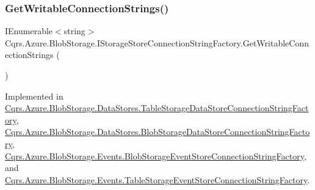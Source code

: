 \subsubsection{\texorpdfstring{Get\+Writable\+Connection\+Strings()}{GetWritableConnectionStrings()}}
{\footnotesize\ttfamily I\+Enumerable$<$string$>$ Cqrs.\+Azure.\+Blob\+Storage.\+I\+Storage\+Store\+Connection\+String\+Factory.\+Get\+Writable\+Connection\+Strings (\begin{DoxyParamCaption}{ }\end{DoxyParamCaption})}



Implemented in \hyperlink{classCqrs_1_1Azure_1_1BlobStorage_1_1DataStores_1_1TableStorageDataStoreConnectionStringFactory_a65b6f404ac2434c6366af73a22e914d1_a65b6f404ac2434c6366af73a22e914d1}{Cqrs.\+Azure.\+Blob\+Storage.\+Data\+Stores.\+Table\+Storage\+Data\+Store\+Connection\+String\+Factory}, \hyperlink{classCqrs_1_1Azure_1_1BlobStorage_1_1DataStores_1_1BlobStorageDataStoreConnectionStringFactory_a71b549351646fd4261b3f52f264759f4_a71b549351646fd4261b3f52f264759f4}{Cqrs.\+Azure.\+Blob\+Storage.\+Data\+Stores.\+Blob\+Storage\+Data\+Store\+Connection\+String\+Factory}, \hyperlink{classCqrs_1_1Azure_1_1BlobStorage_1_1Events_1_1BlobStorageEventStoreConnectionStringFactory_a002b45d6a893b1b3024b0e7c97f1c9ac_a002b45d6a893b1b3024b0e7c97f1c9ac}{Cqrs.\+Azure.\+Blob\+Storage.\+Events.\+Blob\+Storage\+Event\+Store\+Connection\+String\+Factory}, and \hyperlink{classCqrs_1_1Azure_1_1BlobStorage_1_1Events_1_1TableStorageEventStoreConnectionStringFactory_a07406c2607bdd42dd13116b92fc6b665_a07406c2607bdd42dd13116b92fc6b665}{Cqrs.\+Azure.\+Blob\+Storage.\+Events.\+Table\+Storage\+Event\+Store\+Connection\+String\+Factory}.

